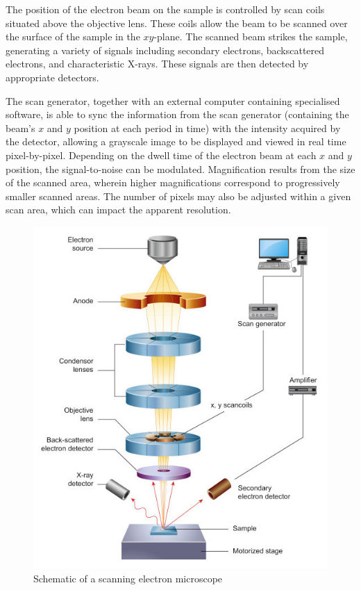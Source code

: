 \documentclass[12pt,a4paper]{article}
\begin{document}
The position of the electron beam on the sample is controlled by scan coils situated above the objective lens. These coils allow the beam to be scanned over the surface of the sample in the $xy$-plane. The scanned beam strikes the sample, generating a variety of signals including secondary electrons, backscattered electrons, and characteristic X-rays. These signals are then detected by appropriate detectors.

The scan generator, together with an external computer containing specialised software, is able to sync the information from the scan generator (containing the beam’s $x$ and $y$ position at each period in time) with the intensity acquired by the detector, allowing a grayscale image to be displayed and viewed in real time pixel-by-pixel. Depending on the dwell time of the electron beam at each $x$ and $y$ position, the signal-to-noise can be modulated. Magnification results from the size of the scanned area, wherein higher magnifications correspond to progressively smaller scanned areas. The number of pixels may also be adjusted within a given scan area, which can impact the apparent resolution.

\begin{figure}[H]
    \centering
    \includegraphics[width=14cm]{images/sem_structure.jpg}
    \caption{Schematic of a scanning electron microscope}
\end{figure}
\end{document}
